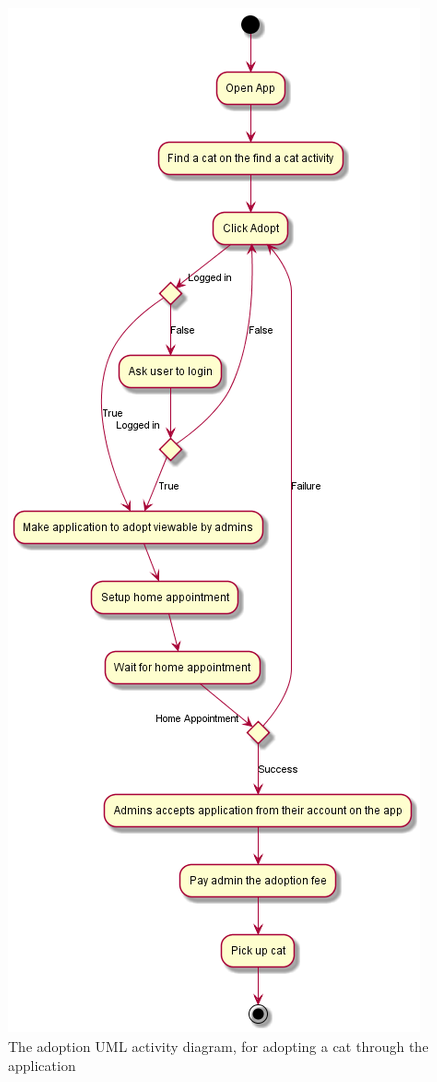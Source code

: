 \begin{figure} [htbp!]
    \centering
    \includegraphics[scale=0.55]{Images/AdoptACat.png}
    \caption{The adoption UML activity diagram, for adopting a cat through the application}
    \label{fig:adoptionProcess}
\end{figure}